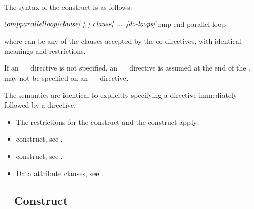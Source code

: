 \begin{fortranspecific}
The syntax of the   construct is as follows:

\begin{ompfPragma}
!$omp parallel loop \plc{[clause[ [},\plc{] clause] ... ]}
   \plc{do-loops}
\plc{[}!$omp end parallel loop\plc{]}
\end{ompfPragma}

where  can be any of the clauses accepted by the  or
   directives, with identical meanings and restrictions.

If an ~~ directive is not specified, an
~~ directive is assumed at the end of the
.  may not be specified on an
~~ directive.
\end{fortranspecific}

\descr
The semantics are identical to explicitly specifying a  directive 
immediately followed by a  directive. 

\restrictions
\begin{itemize}
\item The restrictions for the  construct and the
   construct apply.
\end{itemize}

\crossreferences
\begin{itemize}
\item {} construct, see
.

\item {} construct, see
.

\item Data attribute clauses, see
.
\end{itemize}




\subsection{~ Construct}
\label{subsec:parallel sections Construct}

